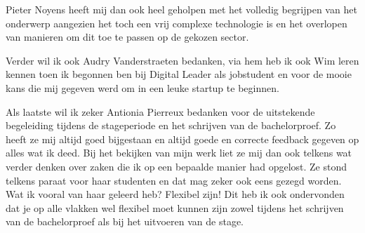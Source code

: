 Pieter Noyens heeft mij dan ook heel geholpen met het volledig begrijpen van het onderwerp aangezien het toch een vrij complexe technologie is en het overlopen van manieren om dit toe te passen op de gekozen sector. 

Verder wil ik ook Audry Vanderstraeten bedanken, via hem heb ik ook Wim leren kennen toen ik begonnen ben bij Digital Leader als jobstudent en voor de mooie kans die mij gegeven werd om in een leuke startup te beginnen.

Als laatste wil ik zeker Antionia Pierreux bedanken voor de uitstekende begeleiding tijdens de stageperiode en het schrijven van de bachelorproef. Zo heeft ze mij altijd goed bijgestaan en altijd goede en correcte feedback gegeven op alles wat ik deed. Bij het bekijken van mijn werk liet ze mij dan ook telkens wat verder denken over zaken die ik op een bepaalde manier had opgelost. Ze stond telkens paraat voor haar studenten en dat mag zeker ook eens gezegd worden. Wat ik vooral van haar geleerd heb? Flexibel zijn! Dit heb ik ook ondervonden dat je op alle vlakken wel flexibel moet kunnen zijn zowel tijdens het schrijven van de bachelorproef als bij het uitvoeren van de stage.